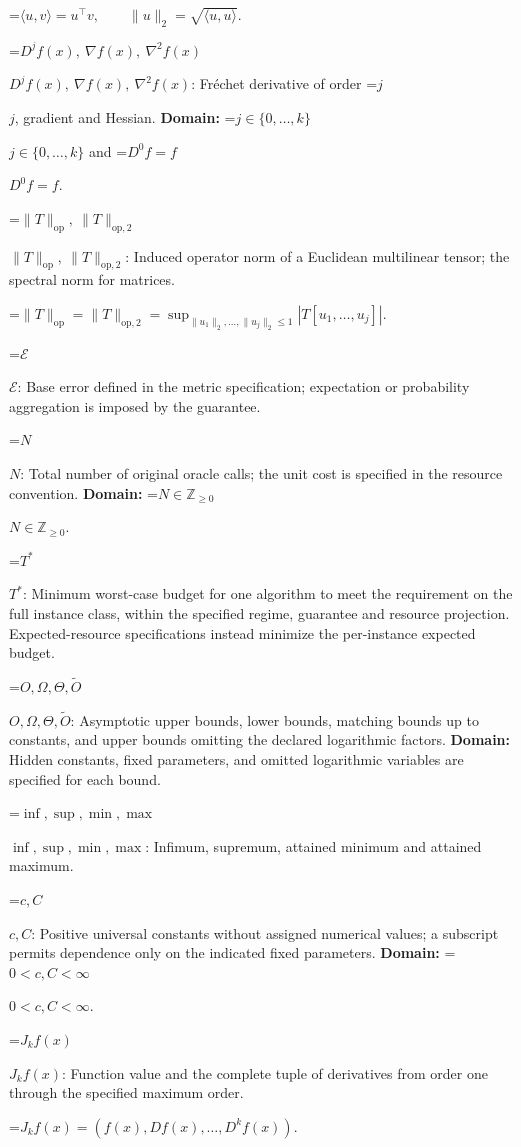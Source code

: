 \documentclass[10pt,a4paper]{article}
\newcommand{\AtlasMath}[1]{\par\begingroup\centering\setbox0=\hbox{$\displaystyle #1$}\ifdim\wd0>1.4\linewidth\typeout{ATLAS WIDE FORMULA: \the\wd0}\fi\ifdim\wd0>\linewidth\resizebox{\linewidth}{!}{\box0}\else\box0\fi\par\endgroup}
\newcommand{\AtlasInlineMath}[1]{\begingroup\setbox0=\hbox{$#1$}\ifdim\wd0>.4\linewidth\endgroup\AtlasMath{#1}\else\endgroup$#1$\fi}
\begin{document}
\AtlasMath{\langle u,v\rangle=u^\top v,\qquad\|u\|_2=\sqrt{\langle u,u\rangle}.}




\AtlasInlineMath{D^jf(x),\ \nabla f(x),\ \nabla^2f(x)}: Fréchet derivative of order \AtlasInlineMath{j}, gradient and Hessian. \textbf{Domain:} \AtlasInlineMath{j\in\{0,\ldots,k\}} and \AtlasInlineMath{D^0f=f}.

\AtlasInlineMath{\|T\|_{\mathrm{op}},\ \|T\|_{\mathrm{op},2}}: Induced operator norm of a Euclidean multilinear tensor; the spectral norm for matrices.




\AtlasMath{\|T\|_{\mathrm{op}}=\|T\|_{\mathrm{op},2}=\sup_{\|u_1\|_2,\ldots,\|u_j\|_2\le1}|T[u_1,\ldots,u_j]|.}




\AtlasInlineMath{\mathcal{E}}: Base error defined in the metric specification; expectation or probability aggregation is imposed by the guarantee.

\AtlasInlineMath{N}: Total number of original oracle calls; the unit cost is specified in the resource convention. \textbf{Domain:} \AtlasInlineMath{N\in\mathbb{Z}_{\ge0}}.

\AtlasInlineMath{T^*}: Minimum worst-case budget for one algorithm to meet the requirement on the full instance class, within the specified regime, guarantee and resource projection. Expected-resource specifications instead minimize the per-instance expected budget.

\AtlasInlineMath{O,\Omega,\Theta,\widetilde{O}}: Asymptotic upper bounds, lower bounds, matching bounds up to constants, and upper bounds omitting the declared logarithmic factors. \textbf{Domain:} Hidden constants, fixed parameters, and omitted logarithmic variables are specified for each bound.

\AtlasInlineMath{\inf,\sup,\min,\max}: Infimum, supremum, attained minimum and attained maximum.

\AtlasInlineMath{c,C}: Positive universal constants without assigned numerical values; a subscript permits dependence only on the indicated fixed parameters. \textbf{Domain:} \AtlasInlineMath{0<c,C<\infty}.

\AtlasInlineMath{J_{k}f(x)}: Function value and the complete tuple of derivatives from order one through the specified maximum order.




\AtlasMath{J_{k}f(x)=(f(x),Df(x),\ldots,D^{k}f(x)).}
\end{document}
